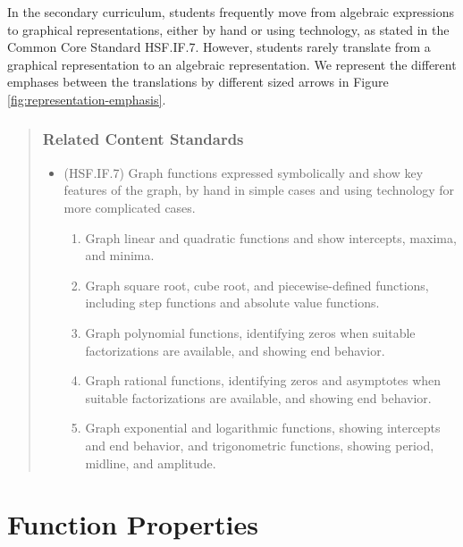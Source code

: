 \documentclass[
]{book}
\providecommand{\tightlist}{%
  \setlength{\itemsep}{0pt}\setlength{\parskip}{0pt}}
\theoremstyle{definition}
\theoremstyle{definition}
\theoremstyle{definition}
\theoremstyle{remark}
\begin{document}
In the secondary curriculum, students frequently move from algebraic expressions to graphical representations, either by hand or using technology, as stated in the Common Core Standard HSF.IF.7. However, students rarely translate from a graphical representation to an algebraic representation. We represent the different emphases between the translations by different sized arrows in Figure \ref{fig:representation-emphasis}.

\begin{quote}
\hypertarget{related-content-standards-37}{%
\subsubsection*{Related Content Standards}\label{related-content-standards-37}}

\begin{itemize}
\tightlist
\item
  (HSF.IF.7) Graph functions expressed symbolically and show key features of the graph, by hand in simple cases and using technology for more complicated cases.

  \begin{enumerate}
  \def\labelenumi{\alph{enumi}.}
  \tightlist
  \item
    Graph linear and quadratic functions and show intercepts, maxima, and minima.
  \item
    Graph square root, cube root, and piecewise-defined functions, including step functions and absolute value functions.
  \item
    Graph polynomial functions, identifying zeros when suitable factorizations are available, and showing end behavior.
  \item
    Graph rational functions, identifying zeros and asymptotes when suitable factorizations are available, and showing end behavior.
  \item
    Graph exponential and logarithmic functions, showing intercepts and end behavior, and trigonometric functions, showing period, midline, and amplitude.
  \end{enumerate}
\end{itemize}
\end{quote}

\hypertarget{function-properties}{%
\section{Function Properties}\label{function-properties}}
\end{document}
